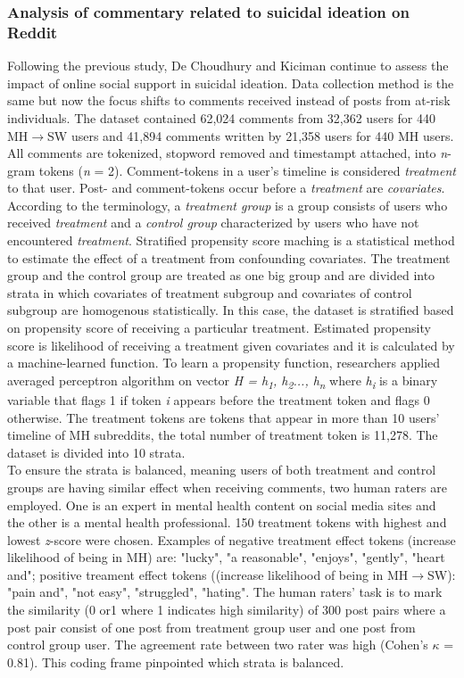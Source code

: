 \subsubsection*{Analysis of commentary related to suicidal ideation on Reddit}
Following the previous study, De Choudhury and Kiciman \cite{DeChoudhury2017} continue to assess the impact of online social support in suicidal ideation. Data collection method is the same but now the focus shifts to comments received instead of posts from at-risk individuals. The dataset contained 62,024 comments from 32,362 users for 440 MH$\rightarrow$SW users and 41,894 comments written by 21,358 users for 440 MH users. All comments are tokenized, stopword removed and timestampt attached, into \textit{n}-gram tokens (\textit{n} = 2). Comment-tokens in a user's timeline is considered \textit{treatment} to that user. Post- and comment-tokens occur before a \textit{treatment} are \textit{covariates}. According to the terminology, a \textit{treatment group} is a group consists of users who received \textit{treatment} and a \textit{control group} characterized by users who have not encountered \textit{treatment}. Stratified propensity score maching is a statistical method to estimate the effect of a treatment from confounding covariates. The treatment group and the control group are treated as one big group and are divided into strata in which covariates of treatment subgroup and covariates of control subgroup are homogenous statistically. In this case, the dataset is stratified based on propensity score of receiving a particular treatment. Estimated propensity score is likelihood of receiving a treatment given covariates and it is calculated by a machine-learned function. To learn a propensity function, researchers applied averaged perceptron algorithm on vector \textit{H = h\textsubscript{1}, h\textsubscript{2}..., h\textsubscript{n}} where \textit{h\textsubscript{i}} is a binary variable that flags 1 if token \textit{i} appears before the treatment token and flags 0 otherwise. The treatment tokens are tokens that appear in more than 10 users' timeline of MH subreddits, the total number of treatment token is 11,278. The dataset is divided into 10 strata.\\
To ensure the strata is balanced, meaning users of both treatment and control groups are having similar effect when receiving comments, two human raters are employed. One is an expert in mental health content on social media sites and the other is a mental health professional. 150 treatment tokens with highest and lowest \textit{z}-score were chosen. Examples of negative treatment effect tokens (increase likelihood of being in MH) are: "lucky", "a reasonable", "enjoys", "gently", "heart and"; positive treament effect tokens ((increase likelihood of being in MH$\rightarrow$SW): "pain and", "not easy", "struggled", "hating". The human raters' task is to mark the similarity (0 or1 where 1 indicates high similarity) of 300 post pairs where a post pair consist of one post from treatment group user and one post from control group user. The agreement rate between two rater was high (Cohen's $\kappa$ = 0.81). This coding frame pinpointed which strata is balanced.\\

